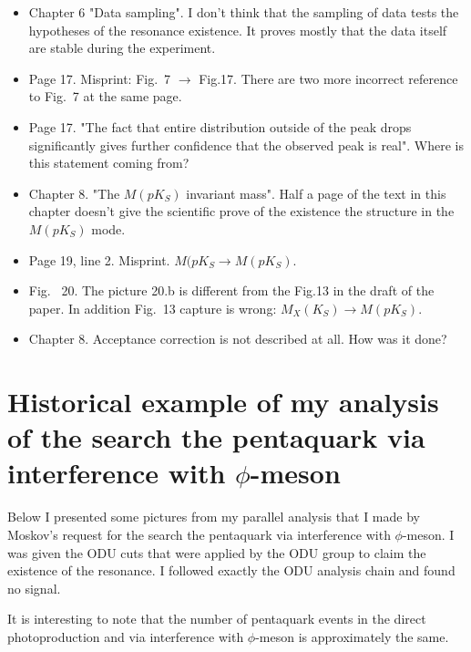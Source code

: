 \documentclass[12pt]{article}
\begin{document}
\begin{itemize}
\item Chapter 6 "Data sampling". I don't think that the sampling of data tests the hypotheses of the resonance existence. It proves mostly that the data itself are stable during the experiment.
\item Page 17. Misprint: Fig.~7 $\to$ Fig.17. There are two more incorrect reference to Fig.~7 at the same page.
\item  Page 17.  "The fact that entire distribution outside of the peak drops significantly gives further confidence that the observed peak is real". Where is this statement coming from?
\item Chapter 8. "The $M(pK_S)$ invariant mass". Half a page of the text in this chapter doesn't give the scientific prove of the existence the structure in the $M(pK_S)$ mode.
\item Page 19, line 2. Misprint. $M(pK_S \to M(pK_S)$.
\item Fig.~ 20. The picture 20.b is different from the Fig.13 in the draft of the paper. In addition Fig.~13 capture is wrong: $M_X(K_S)\to M(pK_S)$. 
\item Chapter 8. Acceptance correction is not described at all. How was it done?
\end    {itemize}

\newpage
\section{Historical example of my analysis of the  search the pentaquark via interference with $\phi$-meson}
Below I presented some pictures from my parallel analysis that I made by Moskov's request for the search the pentaquark via interference with $\phi$-meson.
I was given the ODU cuts that were applied by the ODU group to 
claim the existence of the resonance. I followed exactly the ODU analysis chain and  found no signal.

It is interesting to note that the number of pentaquark events in the direct photoproduction and via interference with $\phi$-meson is approximately the same.
\end{document}
